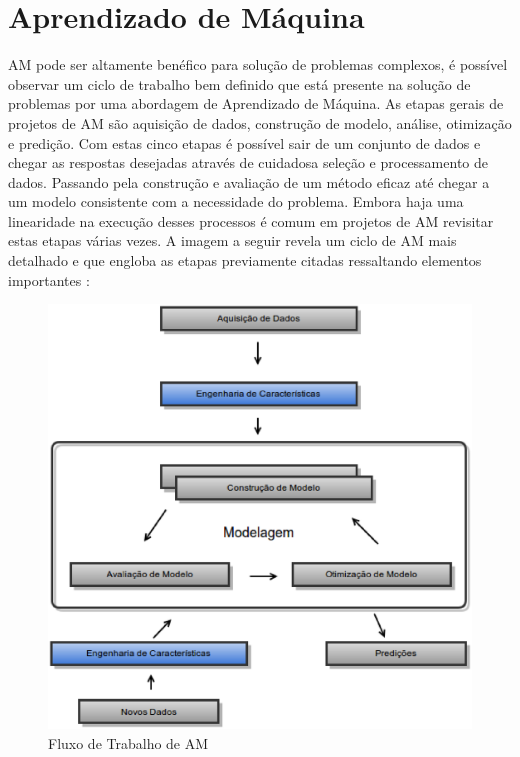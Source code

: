 \chapter{Aprendizado de Máquina}


AM pode ser altamente benéfico para solução de problemas complexos, é possível observar um ciclo de trabalho bem definido que está presente na solução de problemas por uma abordagem de Aprendizado de Máquina. As etapas gerais de projetos de AM são aquisição de dados, construção de modelo, análise, otimização e predição. Com estas cinco etapas é possível sair de um conjunto de dados e chegar as respostas desejadas através de cuidadosa seleção e processamento de dados. Passando pela construção e avaliação de um método eficaz até chegar a um modelo consistente com a necessidade do problema. Embora haja uma linearidade na execução desses processos é comum em projetos de AM revisitar estas etapas várias vezes. A imagem a seguir revela um ciclo de AM mais detalhado e que engloba as etapas previamente citadas ressaltando elementos importantes  \cite{real2013}: 

\begin{figure}[!h]
\centering
\includegraphics[keepaspectratio=true,scale=0.50]
{figuras/workflowml.eps}
\caption{Fluxo de Trabalho de AM}
\label{workflow_am}
\end{figure}

